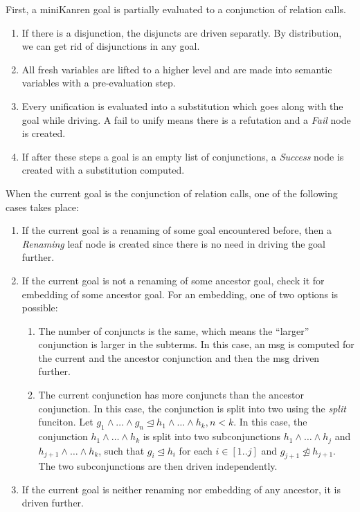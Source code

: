 \documentclass{llncs}
\begin{document}
First, a miniKanren goal is partially evaluated to a conjunction of relation calls.

\begin{enumerate}
  \item If there is a disjunction, the disjuncts are driven separatly. By distribution, we can get rid of disjunctions in any goal. 
  \item All fresh variables are lifted to a higher level and are made into semantic variables with a pre-evaluation step.
  \item Every unification is evaluated into a substitution which goes along with the goal while driving. A fail to unify means there is a refutation and a \emph{Fail} node is created. 
  \item If after these steps a goal is an empty list of conjunctions, a \emph{Success} node is created with a substitution computed. 
\end{enumerate}

When the current goal is the conjunction of relation calls, one of the following cases takes place: 
\begin{enumerate}
  \item If the current goal is a renaming of some goal encountered before, then a \emph{Renaming} leaf node is created since there is no need in driving the goal further. 
  \item If the current goal is not a renaming of some ancestor goal, check it for embedding of some ancestor goal. For an embedding, one of two options is possible:
  \begin{enumerate}
    \item The number of conjuncts is the same, which means the ``larger'' conjunction is larger in the subterms. In this case, an msg is computed for the current and the ancestor conjunction and then the msg driven further. 
    \item The current conjunction has more conjuncts than the ancestor conjunction. In this case, the conjunction is split into two using the \emph{split} funciton. Let $g_1 \wedge \dots \wedge g_n \trianglelefteq h_1 \wedge \dots \wedge h_k, n < k$. In this case, the conjunction $h_1 \wedge \dots \wedge h_k$ is split into two subconjunctions $h_1 \wedge \dots \wedge h_j$ and $h_{j+1} \wedge \dots \wedge h_k$, such that $g_i \trianglelefteq h_i$ for each $i \in [1..j]$ and $g_{j+1} \ntrianglelefteq h_{j+1}$. The two subconjunctions are then driven independently. 
  \end{enumerate}     
  \item If the current goal is neither renaming nor embedding of any ancestor, it is driven further. 
\end{enumerate}
\end{document}
